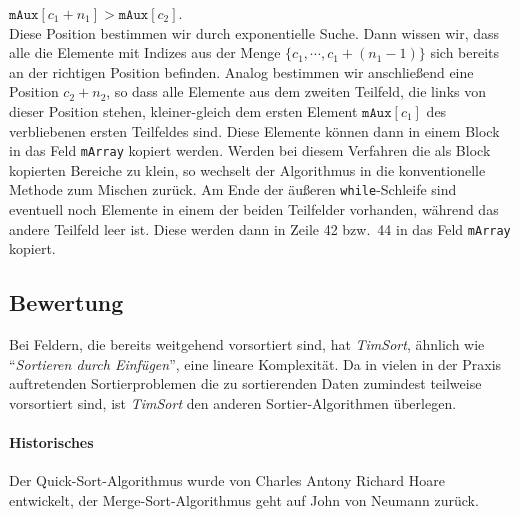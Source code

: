$\mathtt{mAux}[c_1 + n_1] > \mathtt{mAux}[c_2]$.
\\[0.2cm]
Diese Position bestimmen wir durch exponentielle Suche.  Dann wissen wir, dass alle die Elemente mit
Indizes aus der Menge $\{ c_1, \cdots, c_1 + (n_1 - 1) \}$ sich bereits an der richtigen Position
befinden.  Analog bestimmen wir anschlie{\ss}end eine Position $c_2 + n_2$, so dass alle Elemente aus
dem zweiten Teilfeld, die links von dieser Position stehen, kleiner-gleich dem ersten Element
$\mathtt{mAux}[c_1]$ des verbliebenen ersten Teilfeldes sind.   Diese Elemente k\"onnen dann in einem
Block in das Feld \texttt{mArray} kopiert werden.  Werden bei diesem Verfahren die als Block
kopierten Bereiche zu klein, so wechselt der Algorithmus in die konventionelle Methode zum Mischen zur\"uck.
Am Ende der \"au{\ss}eren \texttt{while}-Schleife sind eventuell noch Elemente in einem der beiden
Teilfelder vorhanden, w\"ahrend das andere Teilfeld leer ist.  Diese werden dann in Zeile 42 bzw.~44
in das Feld \texttt{mArray} kopiert.

\subsection{Bewertung}
Bei Feldern, die bereits weitgehend vorsortiert sind, hat \emph{TimSort}, \"ahnlich wie
``\emph{Sortieren durch Einf\"ugen}'', eine lineare Komplexit\"at.  Da in vielen in der Praxis
auftretenden Sortierproblemen die zu sortierenden Daten zumindest teilweise vorsortiert sind, ist
\emph{TimSort} den anderen Sortier-Algorithmen \"uberlegen.

\paragraph{Historisches}  
Der Quick-Sort-Algorithmus wurde von Charles Antony Richard Hoare \cite{hoare:61}
entwickelt, der Merge-Sort-Algorithmus geht auf John von Neumann zur\"uck.

